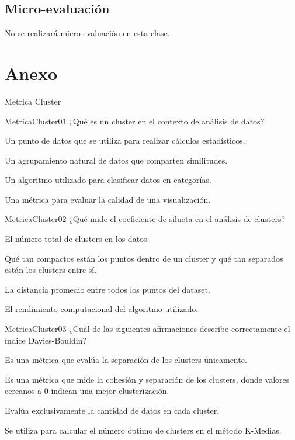\documentclass[a4,11pt]{aleph-notas}
\begin{document}
\subsection{Micro-evaluación}

No se realizará micro-evaluación en esta clase.


\section*{Anexo}

\begin{quiz}{Metrica Cluster}

\begin{multi}
    {MetricaCluster01}
    ¿Qué es un cluster en el contexto de análisis de datos?
    \item Un punto de datos que se utiliza para realizar cálculos estadísticos.
    \item* Un agrupamiento natural de datos que comparten similitudes.
    \item Un algoritmo utilizado para clasificar datos en categorías.
    \item Una métrica para evaluar la calidad de una visualización.
\end{multi}

\begin{multi}
    {MetricaCluster02}
    ¿Qué mide el coeficiente de silueta en el análisis de clusters?
    \item El número total de clusters en los datos.
    \item* Qué tan compactos están los puntos dentro de un cluster y qué tan separados están los clusters entre sí.
    \item La distancia promedio entre todos los puntos del dataset.
    \item El rendimiento computacional del algoritmo utilizado.
\end{multi}

\begin{multi}
    {MetricaCluster03}
    ¿Cuál de las siguientes afirmaciones describe correctamente el índice Davies-Bouldin?
    \item Es una métrica que evalúa la separación de los clusters únicamente.
    \item* Es una métrica que mide la cohesión y separación de los clusters, donde valores cercanos a 0 indican una mejor clusterización.
    \item Evalúa exclusivamente la cantidad de datos en cada cluster.
    \item Se utiliza para calcular el número óptimo de clusters en el método K-Medias.
\end{multi}


\end{quiz}
\end{document}
